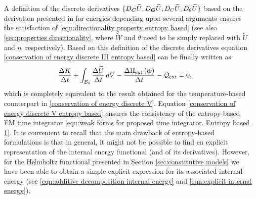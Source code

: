 A definition of the discrete derivatives $\{D_{\boldsymbol{C}}\widetilde{U},D_{\boldsymbol{G}}\widetilde{U},D_{C}\widetilde{U},D_{\theta}\widetilde{U}\}$ based on the derivation presented in \cite{Betsch2018Thermo} for energies depending upon several arguments ensures the satisfaction of \eqref{eqn:directionality property entropy based} (see also \ref{sec:properties directionality}, where $\widetilde{W}$ and $\theta$ need to be simply replaced with $\widetilde{U}$ and $\eta$, respectively). Based on this definition of the discrete derivatives equation \eqref{conservation of energy discrete III entropy based} can be finally written as
%
\begin{equation}\label{conservation of energy discrete V entropy based}
\begin{aligned}
&\frac{\Delta K}{\Delta t} + \int_{\mathcal{B}_0}\frac{\Delta \widetilde{U}}{\Delta t}\,dV- \frac{\Delta\Pi_{\text{ext}}\left(\vect{\phi}\right)}{\Delta t} - \mathcal{Q}_{\text{ext}}= 0,
%
\end{aligned}
\end{equation}
%
which is completely equivalent to the result obtained for the temperature-based counterpart in \eqref{conservation of energy discrete V}. Equation \eqref{conservation of energy discrete V entropy based} ensures the consistency of the entropy-based EM time integrator \eqref{eqn:weak forms for proposed time integrator. Entropy based 1}. It is convenient to recall that the main drawback of entropy-based formulations is that in general, it might not be possible to find en explicit representation of the internal energy functional (and of its derivatives). However, for the Helmholtz functional presented in Section \ref{sec:constitutive models} we have been able to obtain a simple explicit expression for its associated internal energy (see \eqref{eqn:additive decomposition internal energy} and \eqref{eqn:explicit internal energy}).

